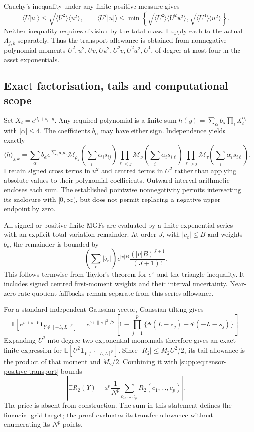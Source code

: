Cauchy's inequality under any finite positive measure gives
\[
 \langle U|u|\rangle\leq
       \sqrt{\langle U^2\rangle\langle u^2\rangle},\qquad
 \langle U^2|u|\rangle\leq
 \min\!\left\{
   \sqrt{\langle U^2\rangle\langle U^2u^2\rangle},
   \sqrt{\langle U^4\rangle\langle u^2\rangle}
 \right\}.
\]
Neither inequality requires division by the total mass. I apply each to
the actual $\Lambda_{j,k}$ separately. Thus the transport allowance is
obtained from nonnegative polynomial moments
$U^2,u^2,Uv,Uu^2,U^2v,U^2u^2,U^4$, of degree at most four in the
asset exponentials.

\subsection{Exact factorisation, tails and computational scope}

Set $X_i=e^{d_i+s_i\cdot y}$. Any required polynomial is a finite sum
$h(y)=\sum_\alpha b_\alpha\prod_iX_i^{\alpha_i}$ with
$|\alpha|\leq4$. The coefficients $b_\alpha$ may have either sign.
Independence yields exactly
\[
 \langle h\rangle_{j,k}
 =\sum_\alpha b_\alpha e^{\sum_i\alpha_id_i}
      \mathcal M_{\rho_k}\!\left(\sum_i\alpha_i s_{ij}\right)
      \prod_{\ell<j}\mathcal M_\nu\!\left(\sum_i\alpha_i s_{i\ell}\right)
      \prod_{\ell>j}\mathcal M_\tau\!\left(\sum_i\alpha_i s_{i\ell}\right).
\]
I retain signed cross terms in $u^2$ and centred terms in $U^2$ rather
than applying absolute values to their polynomial coefficients.
Outward interval arithmetic encloses each sum. The established pointwise
nonnegativity permits intersecting its enclosure with $[0,\infty)$,
but does not permit replacing a negative upper endpoint by zero.

All signed or positive finite MGFs are evaluated by a finite exponential
series with an explicit total-variation remainder. At order $J$, with
$|c_c|\leq B$ and weights $b_c$, the remainder is bounded by
\[
 \left(\sum_c|b_c|\right)
          e^{|v|B}\frac{(|v|B)^{J+1}}{(J+1)!}.
\]
This follows termwise from Taylor's theorem for $e^x$ and the triangle
inequality. It includes signed centred first-moment weights and their
interval uncertainty. Near-zero-rate quotient fallbacks remain separate
from this series allowance.

For a standard independent Gaussian vector, Gaussian tilting gives
\[
 \mathbb E[e^{b+s\cdot Y}\mathbf1_{Y\notin[-L,L]^p}]
 =e^{b+\|s\|^2/2}
   \left[1-\prod_{j=1}^p\{\Phi(L-s_j)-\Phi(-L-s_j)\}\right].
\]
Expanding $U^2$ into degree-two exponential monomials therefore gives
an exact finite expression for $\mathbb E[U^2\mathbf1_{Y\notin[-L,L]^p}]$.
Since $|R_2|\leq M_2U^2/2$, its tail allowance is the product of that
moment and $M_2/2$. Combining it with
\eqref{supp:eq:tensor-positive-transport} bounds
\[
 \left|\mathbb ER_2(Y)-a^p\frac1{N^p}
                   \sum_{c_1,\ldots,c_p}R_2(c_1,\ldots,c_p)\right|.
\]
The price is absent from construction. The sum in this statement defines
the financial grid target; the proof evaluates its transfer allowance
without enumerating its $N^p$ points.

